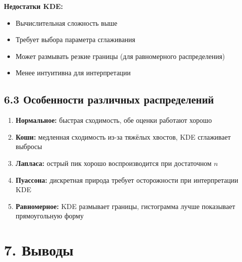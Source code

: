 \documentclass[a4paper,14pt]{extarticle}
\begin{document}
\textbf{Недостатки KDE:}
\begin{itemize}
    \item Вычислительная сложность выше
    \item Требует выбора параметра сглаживания
    \item Может размывать резкие границы (для равномерного распределения)
    \item Менее интуитивна для интерпретации
\end{itemize}

\subsection*{6.3 Особенности различных распределений}

\begin{enumerate}
    \item \textbf{Нормальное:} быстрая сходимость, обе оценки работают хорошо
    \item \textbf{Коши:} медленная сходимость из-за тяжёлых хвостов, KDE сглаживает выбросы
    \item \textbf{Лапласа:} острый пик хорошо воспроизводится при достаточном $n$
    \item \textbf{Пуассона:} дискретная природа требует осторожности при интерпретации KDE
    \item \textbf{Равномерное:} KDE размывает границы, гистограмма лучше показывает прямоугольную форму
\end{enumerate}

\section*{7. Выводы}
\end{document}
